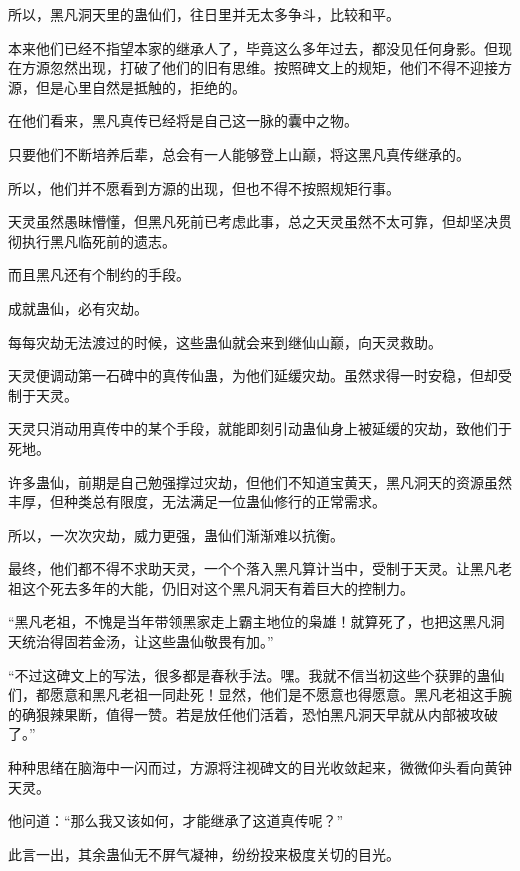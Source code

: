 \begin{this_body}
所以，黑凡洞天里的蛊仙们，往日里并无太多争斗，比较和平。

本来他们已经不指望本家的继承人了，毕竟这么多年过去，都没见任何身影。但现在方源忽然出现，打破了他们的旧有思维。按照碑文上的规矩，他们不得不迎接方源，但是心里自然是抵触的，拒绝的。

在他们看来，黑凡真传已经将是自己这一脉的囊中之物。

只要他们不断培养后辈，总会有一人能够登上山巅，将这黑凡真传继承的。

所以，他们并不愿看到方源的出现，但也不得不按照规矩行事。

天灵虽然愚昧懵懂，但黑凡死前已考虑此事，总之天灵虽然不太可靠，但却坚决贯彻执行黑凡临死前的遗志。

而且黑凡还有个制约的手段。

成就蛊仙，必有灾劫。

每每灾劫无法渡过的时候，这些蛊仙就会来到继仙山巅，向天灵救助。

天灵便调动第一石碑中的真传仙蛊，为他们延缓灾劫。虽然求得一时安稳，但却受制于天灵。

天灵只消动用真传中的某个手段，就能即刻引动蛊仙身上被延缓的灾劫，致他们于死地。

许多蛊仙，前期是自己勉强撑过灾劫，但他们不知道宝黄天，黑凡洞天的资源虽然丰厚，但种类总有限度，无法满足一位蛊仙修行的正常需求。

所以，一次次灾劫，威力更强，蛊仙们渐渐难以抗衡。

最终，他们都不得不求助天灵，一个个落入黑凡算计当中，受制于天灵。让黑凡老祖这个死去多年的大能，仍旧对这个黑凡洞天有着巨大的控制力。

“黑凡老祖，不愧是当年带领黑家走上霸主地位的枭雄！就算死了，也把这黑凡洞天统治得固若金汤，让这些蛊仙敬畏有加。”

“不过这碑文上的写法，很多都是春秋手法。嘿。我就不信当初这些个获罪的蛊仙们，都愿意和黑凡老祖一同赴死！显然，他们是不愿意也得愿意。黑凡老祖这手腕的确狠辣果断，值得一赞。若是放任他们活着，恐怕黑凡洞天早就从内部被攻破了。”

种种思绪在脑海中一闪而过，方源将注视碑文的目光收敛起来，微微仰头看向黄钟天灵。

他问道：“那么我又该如何，才能继承了这道真传呢？”

此言一出，其余蛊仙无不屏气凝神，纷纷投来极度关切的目光。

\end{this_body}


